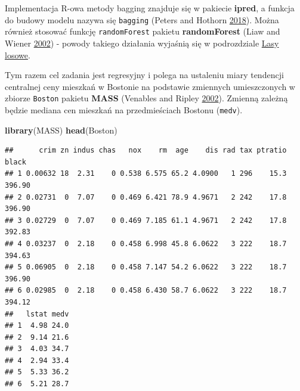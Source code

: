 \documentclass[]{book}
\newenvironment{Shaded}{\begin{snugshade}}{\end{snugshade}}
\newcommand{\DataTypeTok}[1]{\textcolor[rgb]{0.13,0.29,0.53}{#1}}
\newcommand{\DecValTok}[1]{\textcolor[rgb]{0.00,0.00,0.81}{#1}}
\newcommand{\KeywordTok}[1]{\textcolor[rgb]{0.13,0.29,0.53}{\textbf{#1}}}
\newcommand{\NormalTok}[1]{#1}
\newcommand{\OperatorTok}[1]{\textcolor[rgb]{0.81,0.36,0.00}{\textbf{#1}}}
\newcommand{\StringTok}[1]{\textcolor[rgb]{0.31,0.60,0.02}{#1}}
\theoremstyle{plain}
\theoremstyle{definition}
\theoremstyle{definition}
\theoremstyle{definition}
\theoremstyle{definition}
\theoremstyle{remark}
\let\BeginKnitrBlock\begin \let\EndKnitrBlock\end
\begin{document}
Implementacja R-owa metody bagging znajduje się w pakiecie \textbf{ipred}, a funkcja do budowy modelu nazywa się \texttt{bagging} (Peters and Hothorn \protect\hyperlink{ref-R-ipred}{2018}). Można również stosować funkcję \texttt{randomForest} pakietu \textbf{randomForest} (Liaw and Wiener \protect\hyperlink{ref-R-las}{2002}) - powody takiego działania wyjaśnią się w podrozdziale \protect\hyperlink{lasy-losowe}{Lasy losowe}.

\BeginKnitrBlock{example}
\protect\hypertarget{exm:przyk51}{}{\label{exm:przyk51} }Tym razem cel zadania jest regresyjny i polega na ustaleniu miary tendencji centralnej ceny mieszkań w Bostonie na podstawie zmiennych umieszczonych w zbiorze \texttt{Boston} pakietu \textbf{MASS} (Venables and Ripley \protect\hyperlink{ref-R-MASS}{2002}). Zmienną zależną będzie mediana cen mieszkań na przedmieściach Bostonu (\texttt{medv}).
\EndKnitrBlock{example}

\begin{Shaded}
\begin{Highlighting}[]
\KeywordTok{library}\NormalTok{(MASS)}
\KeywordTok{head}\NormalTok{(Boston)}
\end{Highlighting}
\end{Shaded}

\begin{verbatim}
##      crim zn indus chas   nox    rm  age    dis rad tax ptratio  black
## 1 0.00632 18  2.31    0 0.538 6.575 65.2 4.0900   1 296    15.3 396.90
## 2 0.02731  0  7.07    0 0.469 6.421 78.9 4.9671   2 242    17.8 396.90
## 3 0.02729  0  7.07    0 0.469 7.185 61.1 4.9671   2 242    17.8 392.83
## 4 0.03237  0  2.18    0 0.458 6.998 45.8 6.0622   3 222    18.7 394.63
## 5 0.06905  0  2.18    0 0.458 7.147 54.2 6.0622   3 222    18.7 396.90
## 6 0.02985  0  2.18    0 0.458 6.430 58.7 6.0622   3 222    18.7 394.12
##   lstat medv
## 1  4.98 24.0
## 2  9.14 21.6
## 3  4.03 34.7
## 4  2.94 33.4
## 5  5.33 36.2
## 6  5.21 28.7
\end{verbatim}

\begin{Shaded}
\end{Shaded}
\end{document}
